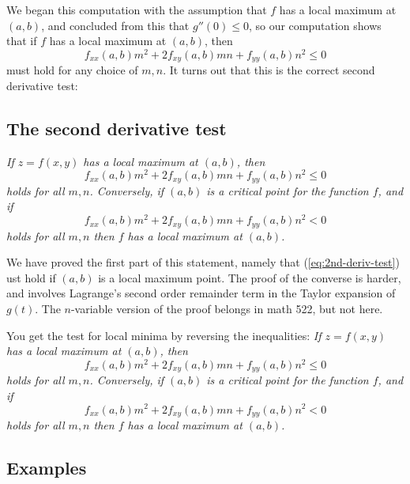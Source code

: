 We began this computation with the assumption that $f$ has a local maximum
at $(a,b)$, and concluded from this that $g''(0)\leq 0$, so our computation
shows that if $f$ has a local maximum at $(a,b)$, then 
\begin{equation}
  f_{xx}(a,b) m^2 + 2f_{xy}(a,b) mn + f_{yy}(a,b)n^2 \leq 0
\end{equation}
must hold for any choice of $m, n$.  It turns out that this is the correct
second derivative test:

\subsection{The second derivative test}
\label{sec:2nd-deriv-test}
\itshape
If $z=f(x, y)$ has a local maximum at $(a,b)$, then
\begin{equation}
  \label{eq:2nd-deriv-test}
    f_{xx}(a,b) m^2 + 2f_{xy}(a,b) mn + f_{yy}(a,b)n^2 \leq 0
\end{equation}
holds for all $m, n$.  Conversely, if $(a, b)$ is a critical point for the
function $f$, and if 
\begin{equation}\label{eq:strict-2nd-deriv-test}
    f_{xx}(a,b) m^2 + 2f_{xy}(a,b) mn + f_{yy}(a,b)n^2 < 0
\end{equation}
holds for all $m,n$ then $f$ has a local maximum at $(a,b)$.
\upshape

We have proved the first part of this statement, namely that
(\ref{eq:2nd-deriv-test}) ust hold if $(a, b)$ is a local maximum point.
The proof of the converse is harder, and involves Lagrange's second order
remainder term in the Taylor expansion of $g(t)$.  The $n$-variable version
of the proof belongs in math 522, but not here.

You get the test for local minima by reversing the inequalities:
\itshape
If $z=f(x, y)$ has a local maximum at $(a,b)$, then
\begin{equation}
    f_{xx}(a,b) m^2 + 2f_{xy}(a,b) mn + f_{yy}(a,b)n^2 \leq 0
\end{equation}
holds for all $m, n$.  Conversely, if $(a, b)$ is a critical point for the
function $f$, and if 
\begin{equation}
    f_{xx}(a,b) m^2 + 2f_{xy}(a,b) mn + f_{yy}(a,b)n^2 < 0
\end{equation}
holds for all $m,n$ then $f$ has a local maximum at $(a,b)$.
\upshape

\subsection{Examples} 
\label{sec:second-deriv-test-examples}



